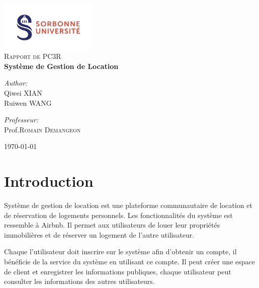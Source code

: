 \documentclass[14px]{article}
\begin{document}
\setlength{\parindent}{0pt}
\begin{titlepage}
	\begin{center}
		\includegraphics[width=0.35\textwidth]{logo.png}\\[1cm]
		\textsc{\Large Rapport de PC3R}\\[0.5cm]
		{ \huge \bfseries Système de Gestion de Location}\\[0.4cm]
		\begin{minipage}{0.4\textwidth}
			\begin{flushleft} \large
				\emph{Author:}\\
				Qiwei \textsc{XIAN}\\
				Ruiwen \textsc{WANG}\\
			\end{flushleft}
		\end{minipage}
		\begin{minipage}{0.4\textwidth}	
				\begin{flushright} \large
				\emph{Professeur:} \\
				Prof.\textsc{Romain Demangeon}
			\end{flushright}
		\end{minipage}
		\vfill
		{\large \today}
	\end{center}
\end{titlepage}
\clearpage

\tableofcontents
\thispagestyle{empty}
\clearpage
\section{Introduction}
Système de gestion de location est une plateforme communautaire de location et de réservation de logements personnels. Les fonctionnalités du système est ressemble à Airbnb. Il permet aux utilisateurs de louer leur propriétés immobilières et de réserver un logement de l'autre utilisateur.

Chaque l'utilisateur doit inscrire sur le système afin d'obtenir un compte, il bénéficie de la service du système en utilisant ce compte. Il peut créer une espace de client et enregistrer les informations publiques, chaque utilisateur peut consulter les informations 
des autres utilisateurs.
\end{document}

